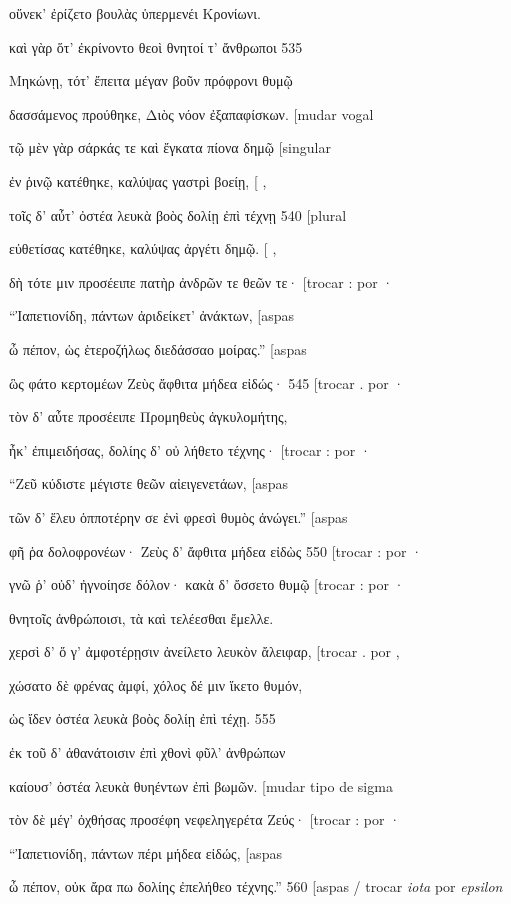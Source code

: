 οὕνεκ' ἐρίζετο βουλὰς ὑπερμενέι Κρονίωνι.

καὶ γὰρ ὅτ' ἐκρίνοντο θεοὶ θνητοί τ' ἄνθρωποι 535

Μηκώνῃ, τότ' ἔπειτα μέγαν βοῦν πρόφρονι θυμῷ

δασσάμενος προύθηκε, Διὸς νόον ἐξαπαφίσκων. {[}mudar vogal

τῷ μὲν γὰρ σάρκάς τε καὶ ἔγκατα πίονα δημῷ {[}singular

ἐν ῥινῷ κατέθηκε, καλύψας γαστρὶ βοείῃ, {[} ,

τοῖς δ' αὖτ' ὀστέα λευκὰ βοὸς δολίῃ ἐπὶ τέχνῃ 540 {[}plural

εὐθετίσας κατέθηκε, καλύψας ἀργέτι δημῷ. {[} ,

δὴ τότε μιν προσέειπε πατὴρ ἀνδρῶν τε θεῶν τε· {[}trocar : por ·

``Ἰαπετιονίδη, πάντων ἀριδείκετ' ἀνάκτων, {[}aspas

ὦ πέπον, ὡς ἑτεροζήλως διεδάσσαο μοίρας.'' {[}aspas

ὣς φάτο κερτομέων Ζεὺς ἄφθιτα μήδεα εἰδώς· 545 {[}trocar . por ·

τὸν δ' αὖτε προσέειπε Προμηθεὺς ἀγκυλομήτης,

ἦκ' ἐπιμειδήσας, δολίης δ' οὐ λήθετο τέχνης· {[}trocar : por ·

``Ζεῦ κύδιστε μέγιστε θεῶν αἰειγενετάων, {[}aspas

τῶν δ' ἕλευ ὁπποτέρην σε ἐνὶ φρεσὶ θυμὸς ἀνώγει.'' {[}aspas

φῆ ῥα δολοφρονέων· Ζεὺς δ' ἄφθιτα μήδεα εἰδὼς 550 {[}trocar : por ·

γνῶ ῥ' οὐδ' ἠγνοίησε δόλον· κακὰ δ' ὄσσετο θυμῷ {[}trocar : por ·

θνητοῖς ἀνθρώποισι, τὰ καὶ τελέεσθαι ἔμελλε.

χερσὶ δ' ὅ γ' ἀμφοτέρῃσιν ἀνείλετο λευκὸν ἄλειφαρ, {[}trocar . por ,

χώσατο δὲ φρένας ἀμφί, χόλος δέ μιν ἵκετο θυμόν,

ὡς ἴδεν ὀστέα λευκὰ βοὸς δολίῃ ἐπὶ τέχῃ. 555

ἐκ τοῦ δ' ἀθανάτοισιν ἐπὶ χθονὶ φῦλ' ἀνθρώπων

καίουσ' ὀστέα λευκὰ θυηέντων ἐπὶ βωμῶν. {[}mudar tipo de sigma

τὸν δὲ μέγ' ὀχθήσας προσέφη νεφεληγερέτα Ζεύς· {[}trocar : por ·

``Ἰαπετιονίδη, πάντων πέρι μήδεα εἰδώς, {[}aspas

ὦ πέπον, οὐκ ἄρα πω δολίης ἐπελήθεο τέχνης.'' 560 {[}aspas / trocar
\emph{iota} por \emph{epsilon}

